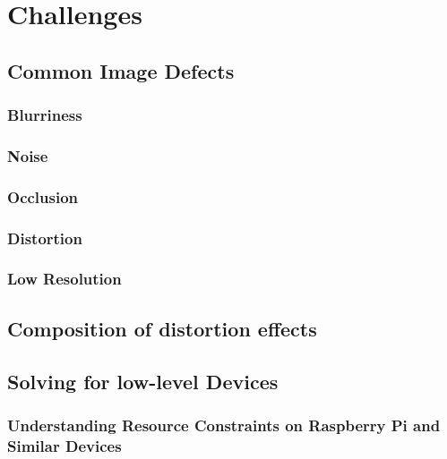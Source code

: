 \chapter{Challenges}
\label{ch:challenges}


\section{Common Image Defects}
\label{sec:common-image-defects}

\subsection{Blurriness}
\label{subsec:blurriness}

\subsection{Noise}
\label{subsec:noise}

\subsection{Occlusion}
\label{subsec:occlusion}

\subsection{Distortion}
\label{subsec:distortion}

\subsection{Low Resolution}
\label{subsec:low-resolution}


\section{Composition of distortion effects}
\label{sec:composition-of-distortion-effects}


\section{Solving for low-level Devices}
\label{sec:solving-for-low-level-devices}

\subsection{Understanding Resource Constraints on Raspberry Pi and Similar Devices}
\label{subsec:understanding-resource-constraints-on-raspberry-pi-and-similar-devices}


